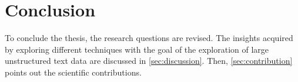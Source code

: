 \chapter{Conclusion}\label{ch:conclusion}

To conclude the thesis, the research questions are revised.
The insights acquired by exploring different techniques with the goal of the exploration of large unstructured text data
are discussed in \autoref{sec:discussion}.
Then, \autoref{sec:contribution} points out the scientific contributions.






